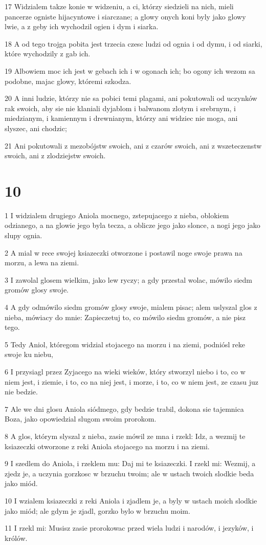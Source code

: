 \par 17 Widzialem takze konie w widzeniu, a ci, którzy siedzieli na nich, mieli pancerze ogniste hijacyntowe i siarczane; a glowy onych koni byly jako glowy lwie, a z geby ich wychodzil ogien i dym i siarka.
\par 18 A od tego trojga pobita jest trzecia czesc ludzi od ognia i od dymu, i od siarki, które wychodzily z gab ich.
\par 19 Albowiem moc ich jest w gebach ich i w ogonach ich; bo ogony ich wezom sa podobne, majac glowy, któremi szkodza.
\par 20 A inni ludzie, którzy nie sa pobici temi plagami, ani pokutowali od uczynków rak swoich, aby sie nie klaniali dyjablom i balwanom zlotym i srebrnym, i miedzianym, i kamiennym i drewnianym, którzy ani widziec nie moga, ani slyszec, ani chodzic;
\par 21 Ani pokutowali z mezobójstw swoich, ani z czarów swoich, ani z wszeteczenstw swoich, ani z zlodziejstw swoich.

\chapter{10}

\par 1 I widzialem drugiego Aniola mocnego, zstepujacego z nieba, oblokiem odzianego, a na glowie jego byla tecza, a oblicze jego jako slonce, a nogi jego jako slupy ognia.
\par 2 A mial w rece swojej ksiazeczki otworzone i postawil noge swoje prawa na morzu, a lewa na ziemi.
\par 3 I zawolal glosem wielkim, jako lew ryczy; a gdy przestal wolac, mówilo siedm gromów glosy swoje.
\par 4 A gdy odmówilo siedm gromów glosy swoje, mialem pisac; alem uslyszal glos z nieba, mówiacy do mnie: Zapieczetuj to, co mówilo siedm gromów, a nie pisz tego.
\par 5 Tedy Aniol, któregom widzial stojacego na morzu i na ziemi, podniósl reke swoje ku niebu,
\par 6 I przysiagl przez Zyjacego na wieki wieków, który stworzyl niebo i to, co w niem jest, i ziemie, i to, co na niej jest, i morze, i to, co w niem jest, ze czasu juz nie bedzie.
\par 7 Ale we dni glosu Aniola siódmego, gdy bedzie trabil, dokona sie tajemnica Boza, jako opowiedzial slugom swoim prorokom.
\par 8 A glos, którym slyszal z nieba, zasie mówil ze mna i rzekl: Idz, a wezmij te ksiazeczki otworzone z reki Aniola stojacego na morzu i na ziemi.
\par 9 I szedlem do Aniola, i rzeklem mu: Daj mi te ksiazeczki. I rzekl mi: Wezmij, a zjedz je, a uczynia gorzkosc w brzuchu twoim; ale w ustach twoich slodkie beda jako miód.
\par 10 I wzialem ksiazeczki z reki Aniola i zjadlem je, a byly w ustach moich slodkie jako miód; ale gdym je zjadl, gorzko bylo w brzuchu moim.
\par 11 I rzekl mi: Musisz zasie prorokowac przed wiela ludzi i narodów, i jezyków, i królów.

